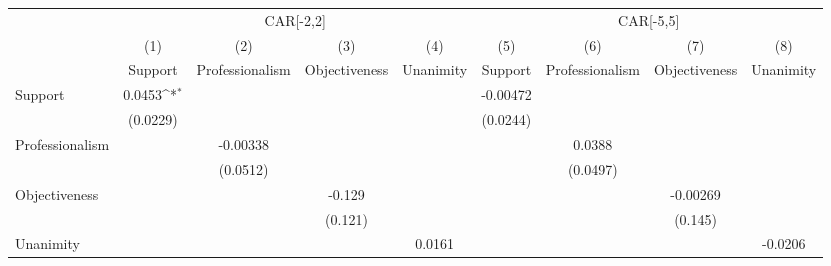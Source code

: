 {
\def\sym#1{\ifmmode^{#1}\else\(^{#1}\)\fi}
\begin{tabular}{l*{8}{c}}
\hline\hline
                    &\multicolumn{4}{c}{CAR[-2,2]}                                                          &\multicolumn{4}{c}{CAR[-5,5]}                                                          \\
                    &\multicolumn{1}{c}{(1)}&\multicolumn{1}{c}{(2)}&\multicolumn{1}{c}{(3)}&\multicolumn{1}{c}{(4)}&\multicolumn{1}{c}{(5)}&\multicolumn{1}{c}{(6)}&\multicolumn{1}{c}{(7)}&\multicolumn{1}{c}{(8)}\\
                    &\multicolumn{1}{c}{Support}&\multicolumn{1}{c}{Professionalism}&\multicolumn{1}{c}{Objectiveness}&\multicolumn{1}{c}{Unanimity}&\multicolumn{1}{c}{Support}&\multicolumn{1}{c}{Professionalism}&\multicolumn{1}{c}{Objectiveness}&\multicolumn{1}{c}{Unanimity}\\
\hline
Support             &      0.0453\sym{*}  &                     &                     &                     &    -0.00472         &                     &                     &                     \\
                    &    (0.0229)         &                     &                     &                     &    (0.0244)         &                     &                     &                     \\
Professionalism     &                     &    -0.00338         &                     &                     &                     &      0.0388         &                     &                     \\
                    &                     &    (0.0512)         &                     &                     &                     &    (0.0497)         &                     &                     \\
Objectiveness       &                     &                     &      -0.129         &                     &                     &                     &    -0.00269         &                     \\
                    &                     &                     &     (0.121)         &                     &                     &                     &     (0.145)         &                     \\
Unanimity           &                     &                     &                     &      0.0161         &                     &                     &                     &     -0.0206         \\

\end{tabular}}
